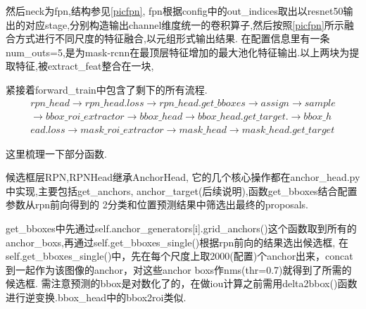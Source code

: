 \documentclass[UTF8]{ctexart}
\begin{document}
然后neck为fpn,结构参见\ref{picfpn},
fpn根据config中的out\_indices取出以resnet50输出的对应stage,分别构造输出channel维度统一的卷积算子,然后按照\ref{picfpn}所示融合方式进行不同尺度的特征融合,以元组形式输出结果.
在配置信息里有一条num\_outs=5,是为mask-rcnn在最顶层特征增加的最大池化特征输出.以上两块为提取特征,被extract\_feat整合在一块,



紧接着forward\_train中包含了剩下的所有流程.
\begin{equation*}
	\begin{aligned}
		 rpn\_head \rightarrow rpn\_head.loss \rightarrow rpn\_head.get\_bboxes \rightarrow assign \rightarrow sample \\
		\rightarrow bbox\_roi\_extractor \rightarrow  bbox\_head \rightarrow bbox\_head.get\_target. \rightarrow bbox\_h\\
		ead.loss \rightarrow mask\_roi\_extractor \rightarrow mask\_head \rightarrow mask\_head.get\_target
	\end{aligned}
\end{equation*} 

这里梳理一下部分函数.

候选框层RPN,RPNHead继承AnchorHead, 它的几个核心操作都在anchor\_head.py中实现,主要包括get\_anchors, anchor\_target(后续说明),函数get\_bboxes结合配置参数从rpn前向得到的
2分类和位置预测结果中筛选出最终的proposals.

get\_bboxes中先通过self.anchor\_generators[i].grid\_anchors()这个函数取到所有的anchor\_boxs,再通过self.get\_bboxes\_single()根据rpn前向的结果选出候选框,
在self.get\_bboxes\_single()中，先在每个尺度上取2000(配置)个anchor出来，concat到一起作为该图像的anchor，对这些anchor boxs作nms(thr=0.7)就得到了所需的候选框.
需注意预测的bbox是对数化了的，在做iou计算之前需用delta2bbox()函数进行逆变换.bbox\_head中的bbox2roi类似.
\end{document}
